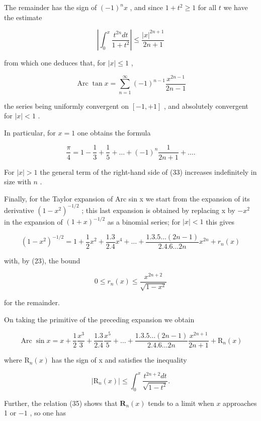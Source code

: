 The remainder has the sign of \((-1)^n x\) , and since \(1 + t^2 \geqslant 1\) for all \(t\) we have the estimate

\[
\left| \int_ {0} ^ {x} \frac {t ^ {2 n} d t}{1 + t ^ {2}} \right| \leqslant \frac {| x | ^ {2 n + 1}}{2 n + 1}\tag{32}
\]

from which one deduces that, for \(|x| \leqslant 1\) ,

\[
\operatorname{Arc} \tan x = \sum_ {n = 1} ^ {\infty} (- 1) ^ {n - 1} \frac {x ^ {2 n - 1}}{2 n - 1}\tag{33}
\]

the series being uniformly convergent on \([-1,+1]\) , and absolutely convergent for \(|x|<1\) .

In particular, for \(x = 1\) one obtains the formula

\[
{\frac {\pi}{4}} = 1 - {\frac {1}{3}} + {\frac {1}{5}} + \dots + (- 1) ^ {n} {\frac {1}{2 n + 1}} + \dots .\tag{34}
\]

For \(|x| > 1\) the general term of the right-hand side of (33) increases indefinitely in size with \(n\) .

Finally, for the Taylor expansion of Arc sin x we start from the expansion of its derivative \((1 - x^{2})^{-1/2}\) ; this last expansion is obtained by replacing x by \(-x^{2}\) in the expansion of \((1 + x)^{-1/2}\) as a binomial series; for \(|x| < 1\) this gives

\[
(1 - x ^ {2}) ^ {- 1 / 2} = 1 + \frac {1}{2} x ^ {2} + \frac {1 . 3}{2 . 4} x ^ {4} + \dots + \frac {1 . 3 . 5 \dots (2 n - 1)}{2 . 4 . 6 \dots 2 n} x ^ {2 n} + r _ {n} (x)
\]

with, by (23), the bound

\[
0 \leqslant r _ {n} (x) \leqslant \frac {x ^ {2 n + 2}}{\sqrt {1 - x ^ {2}}}
\]

for the remainder.

On taking the primitive of the preceding expansion we obtain

\[
\operatorname{Arc} \sin x = x + \frac {1}{2} \frac {x ^ {3}}{3} + \frac {1 . 3}{2 . 4} \frac {x ^ {5}}{5} + \dots + \frac {1 . 3 . 5 \dots (2 n - 1)}{2 . 4 . 6 \dots 2 n} \frac {x ^ {2 n + 1}}{2 n + 1} + \mathrm{R} _ {n} (x)\tag{35}
\]

where \(\mathrm{R}_{n}(x)\) has the sign of x and satisfies the inequality

\[
| \mathrm{R} _ {n} (x) | \leqslant \int_ {0} ^ {x} \frac {t ^ {2 n + 2} d t}{\sqrt {1 - t ^ {2}}}.\tag{36}
\]

Further, the relation (35) shows that \(\mathbf{R}_n(x)\) tends to a limit when \(x\) approaches 1 or \(-1\) , so one has


